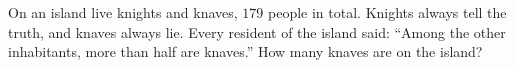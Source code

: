 On an island live knights and knaves, $179$ people in total. Knights always tell the truth, and knaves always lie. Every resident of the island said: ``Among the other inhabitants, more than half are knaves.'' How many knaves are on the island?
